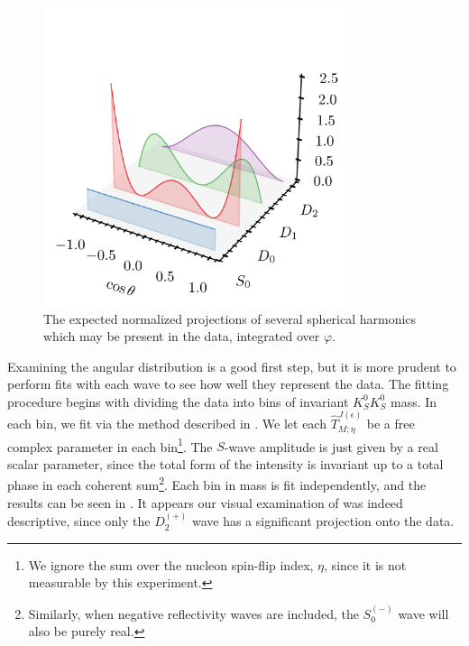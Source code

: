 \begin{figure}
  \begin{center}
    \includegraphics[width=0.8\textwidth]{figures/spherical_harmonics.png}
  \end{center}
  \caption{The expected normalized projections of several spherical harmonics which may be present in the data, integrated over $\varphi$.}\label{fig:spherical-harmonics}
\end{figure}

Examining the angular distribution is a good first step, but it is more prudent to perform fits with each wave to see how well they represent the data. The fitting procedure begins with dividing the data into bins of invariant $K_S^0K_S^0$ mass. In each bin, we fit  via the method described in . We let each $\hat{T}_{M;\eta}^{J(\epsilon)}$ be a free complex parameter in each bin\footnote{We ignore the sum over the nucleon spin-flip index, $\eta$, since it is not measurable by this experiment.}. The $S$-wave amplitude is just given by a real scalar parameter, since the total form of the intensity is invariant up to a total phase in each coherent sum\footnote{Similarly, when negative reflectivity waves are included, the $S_0^{(-)}$ wave will also be purely real.}. Each bin in mass is fit independently, and the results can be seen in . It appears our visual examination of  was indeed descriptive, since only the $D_2^{(+)}$ wave has a significant projection onto the data.

